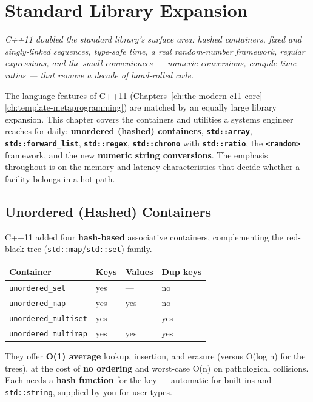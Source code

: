 \chapter{Standard Library Expansion}
\label{ch:standard-library-expansion}

\textit{C++11 doubled the standard library's surface area: hashed containers, fixed and singly-linked sequences, type-safe time, a real random-number framework, regular expressions, and the small conveniences --- numeric conversions, compile-time ratios --- that remove a decade of hand-rolled code.}

The language features of C++11 (Chapters~\ref{ch:the-modern-c11-core}--\ref{ch:template-metaprogramming}) are matched by an equally large library expansion. This chapter covers the containers and utilities a systems engineer reaches for daily: \textbf{unordered (hashed) containers}, \textbf{\texttt{std::array}}, \textbf{\texttt{std::forward\_list}}, \textbf{\texttt{std::regex}}, \textbf{\texttt{std::chrono}} with \textbf{\texttt{std::ratio}}, the \textbf{\texttt{<random>}} framework, and the new \textbf{numeric string conversions}. The emphasis throughout is on the memory and latency characteristics that decide whether a facility belongs in a hot path.

\section{Unordered (Hashed) Containers}

C++11 added four \textbf{hash-based} associative containers, complementing the red-black-tree (\texttt{std::map}/\texttt{std::set}) family.

\begin{center}
\begin{tabular}{|l|l|l|l|}
\hline \textbf{Container} & \textbf{Keys} & \textbf{Values} & \textbf{Dup keys} \\ \hline
\texttt{unordered\_set}      & yes & ---  & no  \\
\texttt{unordered\_map}      & yes & yes  & no  \\
\texttt{unordered\_multiset} & yes & ---  & yes \\
\texttt{unordered\_multimap} & yes & yes  & yes \\
\hline
\end{tabular}
\end{center}

They offer \textbf{O(1) average} lookup, insertion, and erasure (versus O(log n) for the trees), at the cost of \textbf{no ordering} and worst-case O(n) on pathological collisions. Each needs a \textbf{hash function} for the key --- automatic for built-ins and \texttt{std::string}, supplied by you for user types.


